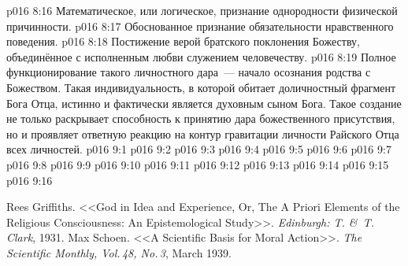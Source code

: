\vs p016 8:16 Математическое, или логическое, признание однородности физической причинности.
\vs p016 8:17 Обоснованное признание обязательности нравственного поведения.
\vs p016 8:18 Постижение верой братского поклонения Божеству, объединённое с исполненным любви служением человечеству.
\vs p016 8:19 \pc Полное функционирование такого личностного дара~--- начало осознания родства с Божеством. Такая индивидуальность, в которой обитает доличностный фрагмент Бога Отца, истинно и фактически является духовным сыном Бога. Такое создание не только раскрывает способность к принятию дара божественного присутствия, но и проявляет ответную реакцию на контур гравитации личности Райского Отца всех личностей.
\vs p016 9:1 
\vs p016 9:2 
\vs p016 9:3 
\vs p016 9:4 \pc 
\vs p016 9:5 
\vs p016 9:6 
\vs p016 9:7 \pc 
\vs p016 9:8 
\vs p016 9:9 
\vs p016 9:10 
\vs p016 9:11 
\vs p016 9:12 
\vs p016 9:13 
\vs p016 9:14 \pc 
\vs p016 9:15 
\vsetoff
\vs p016 9:16 
\quizlink
\begin{thebibliography}{100}
Rees Griffiths.
{<<God in Idea and Experience, Or, The A Priori Elements of the Religious Consciousness: An Epistemological Study>>.}
{\em Edinburgh: T. \&\ T. Clark}, 1931.
Max Schoen.
{<<A Scientific Basis for Moral Action>>.}
{\em The Scientific Monthly, Vol.\,48, No.\,3}, March 1939.
\end{thebibliography}
